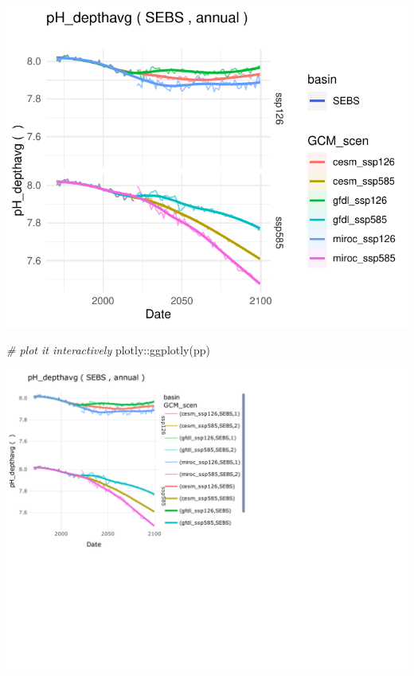 \documentclass[
]{article}
\newenvironment{Shaded}{\begin{snugshade}}{\end{snugshade}}
\newcommand{\CommentTok}[1]{\textcolor[rgb]{0.56,0.35,0.01}{\textit{#1}}}
\newcommand{\FunctionTok}[1]{\textcolor[rgb]{0.00,0.00,0.00}{#1}}
\newcommand{\NormalTok}[1]{#1}
\newcommand{\SpecialCharTok}[1]{\textcolor[rgb]{0.00,0.00,0.00}{#1}}
\begin{document}
\begin{center}\includegraphics{ACLIM2_quickStart_files/figure-latex/unnamed-chunk-7-2} \end{center}

\begin{Shaded}
\begin{Highlighting}[]
  \CommentTok{\# plot it interactively}
\NormalTok{  plotly}\SpecialCharTok{::}\FunctionTok{ggplotly}\NormalTok{(pp)}
\end{Highlighting}
\end{Shaded}

\begin{center}\includegraphics{ACLIM2_quickStart_files/figure-latex/unnamed-chunk-8-1} \end{center}
\end{document}
